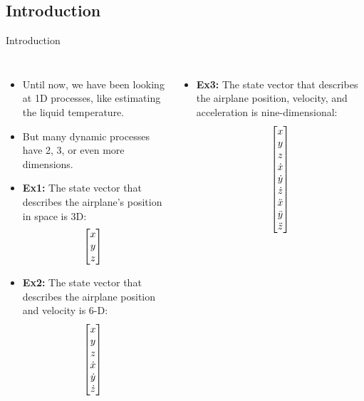 \subsection{Introduction}
\begin{frame}{Introduction}
\begin{columns}
        \begin{itemize}
            \item Until now, we have been looking at 1D processes, like estimating the liquid temperature.
            \item But many dynamic processes have 2, 3, or even more dimensions.
            \item \textbf{Ex1:} The state vector that describes the airplane's position in space is 3D:
            \begin{equation*}
            \centering
            \begin{bmatrix}
            x\\
            y\\
            z\\
            \end{bmatrix}
            \end{equation*}
            \item \textbf{Ex2:} The state vector that describes the airplane position and velocity is 6-D:
            \begin{equation*}
            \centering
            \begin{bmatrix}
            x\\
            y\\
            z\\
            \dot{x}\\
            \dot{y}\\
            \dot{z}\\
            \end{bmatrix}
            \end{equation*}
        \end{itemize}
    \begin{itemize}
        \item \textbf{Ex3:} The state vector that describes the airplane position, velocity, and acceleration is nine-dimensional:
            \begin{equation*}
            \centering
            \begin{bmatrix}
            x\\
            y\\
            z\\
            \dot{x}\\
            \dot{y}\\
            \dot{z}\\
            \ddot{x}\\
            \ddot{y}\\
            \ddot{z}\\
            \end{bmatrix}
            \end{equation*}
        

\end{itemize}
\end{columns}
\end{frame}
